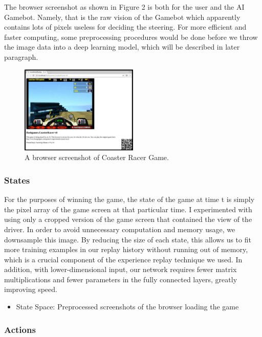 \documentclass[a4paper]{article}
\begin{document}
The browser screenshot as shown in Figure 2 is both for the user and the AI Gamebot. Namely, that is the raw vision of the Gamebot which apparently contains lots of pixels useless for deciding the steering. For more efficient and faster computing, some preprocessing procedures would be done before we throw the image data into a deep learning model, which will be described in later paragraph.

\begin{figure}[h]
\centering
\includegraphics[width=0.5\textwidth]{raw-vision-of-game}
\caption{A browser screenshot of Coaster Racer Game.}
\end{figure}

\subsubsection{States}

For the purposes of winning the game, the state of the game at time t is simply the pixel array of the game screen at that particular time. I experimented with using only a cropped version of the game screen that contained the view of the driver. In order to avoid unnecessary computation and memory usage, we downsample this image. By reducing the size of each state, this allows us to fit more training examples in our replay history without running out of memory, which is a crucial component of the experience replay technique we used. In addition, with lower-dimensional input, our network requires fewer matrix multiplications and fewer parameters in the fully connected layers, greatly improving speed.

\begin{itemize}
		
	\item State Space: {Preprocessed screenshots of the browser loading the game}

\end{itemize}

\subsubsection{Actions}
\end{document}
